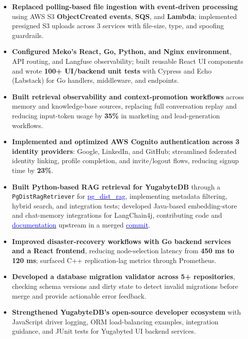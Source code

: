 \documentclass[letterpaper,10pt]{article}
\newcommand{\resumeBullet}[1]{\item\small{#1}}
\newcommand{\resumeBulletListStart}{\begin{itemize}[leftmargin=0.17in, label=\textbullet, itemsep=0pt, topsep=0pt, parsep=0pt, partopsep=0pt]}
\newcommand{\resumeBulletListEnd}{\end{itemize}}
\begin{document}
      \resumeBulletListStart
          \setlength{\itemsep}{0pt}
          \resumeBullet{\textbf{Replaced polling-based file ingestion with event-driven processing} using AWS S3 \textbf{ObjectCreated events}, \textbf{SQS}, and \textbf{Lambda}; implemented presigned S3 uploads across 3 services with file-size, type, and spoofing guardrails.}
          \resumeBullet{\textbf{Configured Meko's React, Go, Python, and Nginx environment}, API routing, and Langfuse observability; built reusable React UI components and wrote \textbf{100+ UI/backend unit tests} with Cypress and Echo (Labstack) for Go handlers, middleware, and endpoints.}
          \resumeBullet{\textbf{Built retrieval observability and context-promotion workflows} across memory and knowledge-base sources, replacing full conversation replay and reducing input-token usage by \textbf{35\%} in marketing and lead-generation workflows.}
          \resumeBullet{\textbf{Implemented and optimized AWS Cognito authentication across 3 identity providers}: Google, LinkedIn, and GitHub; streamlined federated identity linking, profile completion, and invite/logout flows, reducing signup time by \textbf{23\%}.}
          \resumeBullet{\textbf{Built Python-based RAG retrieval for YugabyteDB} through a \texttt{PgDistRagRetriever} for \href{https://docs.yugabyte.com/stable/develop/ai/distributed-rag/}{\textcolor{blue}{pg\_dist\_rag}}, implementing metadata filtering, hybrid search, and integration tests; developed Java-based embedding-store and chat-memory integrations for LangChain4j, contributing code and \href{https://docs.langchain4j.dev/integrations/embedding-stores/yugabytedb}{\textcolor{blue}{documentation}} upstream in a merged \href{https://github.com/langchain4j/langchain4j-community/commit/90c2f0fae2f71b786c96d246de220a7529dc88fc}{\textcolor{blue}{commit}}.}
          \resumeBullet{\textbf{Improved disaster-recovery workflows with Go backend services and a React frontend}, reducing node-selection latency from \textbf{450 ms to 120 ms}; surfaced C++ replication-lag metrics through Prometheus.}
          \resumeBullet{\textbf{Developed a database migration validator across 5+ repositories}, checking schema versions and dirty state to detect invalid migrations before merge and provide actionable error feedback.}
          \resumeBullet{\textbf{Strengthened YugabyteDB's open-source developer ecosystem} with JavaScript driver logging, ORM load-balancing examples, integration guidance, and JUnit tests for Yugabyted UI backend services.}
      \resumeBulletListEnd
\end{document}
